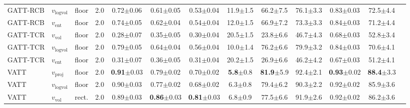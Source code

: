 \begin{table}[t]
{\begin{tabular}{lllcccccccccc}
GATT-RCB & $v_{\mathrm{logvol}}$ & floor & 2.0 & 0.72{\scriptsize$\pm$0.06} & 0.61{\scriptsize$\pm$0.05} & 0.53{\scriptsize$\pm$0.04} & 11.9{\scriptsize$\pm$1.5} & 66.2{\scriptsize$\pm$7.5} & 76.1{\scriptsize$\pm$3.3} & 0.83{\scriptsize$\pm$0.03} & 72.5{\scriptsize$\pm$4.4} \\
GATT-RCB & $v_{\mathrm{ent}}$ & floor & 2.0 & 0.74{\scriptsize$\pm$0.05} & 0.62{\scriptsize$\pm$0.04} & 0.54{\scriptsize$\pm$0.04} & 12.0{\scriptsize$\pm$1.5} & 66.9{\scriptsize$\pm$7.2} & 73.3{\scriptsize$\pm$3.3} & 0.84{\scriptsize$\pm$0.03} & 71.2{\scriptsize$\pm$4.4} \\
\addlinespace[2pt]
GATT-TCR & $v_{\mathrm{vol}}$ & floor & 2.0 & 0.28{\scriptsize$\pm$0.07} & 0.35{\scriptsize$\pm$0.05} & 0.30{\scriptsize$\pm$0.04} & 20.5{\scriptsize$\pm$1.5} & 23.8{\scriptsize$\pm$6.6} & 46.7{\scriptsize$\pm$4.3} & 0.68{\scriptsize$\pm$0.03} & 52.8{\scriptsize$\pm$3.4} \\
GATT-TCR & $v_{\mathrm{logvol}}$ & floor & 2.0 & 0.79{\scriptsize$\pm$0.05} & 0.64{\scriptsize$\pm$0.04} & 0.56{\scriptsize$\pm$0.04} & 10.0{\scriptsize$\pm$1.4} & 76.2{\scriptsize$\pm$6.6} & 79.9{\scriptsize$\pm$3.2} & 0.84{\scriptsize$\pm$0.03} & 70.6{\scriptsize$\pm$4.1} \\
GATT-TCR & $v_{\mathrm{ent}}$ & floor & 2.0 & 0.31{\scriptsize$\pm$0.07} & 0.36{\scriptsize$\pm$0.05} & 0.31{\scriptsize$\pm$0.04} & 20.2{\scriptsize$\pm$1.5} & 26.9{\scriptsize$\pm$6.6} & 46.2{\scriptsize$\pm$4.2} & 0.67{\scriptsize$\pm$0.03} & 51.2{\scriptsize$\pm$4.1} \\
\addlinespace[2pt]
VATT & $v_{\mathrm{proj}}$ & floor & 2.0 & \textbf{0.91}{\scriptsize$\pm$0.03} & 0.79{\scriptsize$\pm$0.02} & 0.70{\scriptsize$\pm$0.02} & \textbf{5.8}{\scriptsize$\pm$0.8} & \textbf{81.9}{\scriptsize$\pm$5.9} & 92.4{\scriptsize$\pm$2.1} & \textbf{0.93}{\scriptsize$\pm$0.02} & \textbf{88.4}{\scriptsize$\pm$3.3} \\
VATT & $v_{\mathrm{logvol}}$ & floor & 2.0 & 0.90{\scriptsize$\pm$0.03} & 0.77{\scriptsize$\pm$0.02} & 0.68{\scriptsize$\pm$0.02} & 6.3{\scriptsize$\pm$0.8} & 79.4{\scriptsize$\pm$6.2} & 90.3{\scriptsize$\pm$2.2} & 0.92{\scriptsize$\pm$0.02} & 85.9{\scriptsize$\pm$3.6} \\
VATT & $v_{\mathrm{vol}}$ & rect. & 2.0 & 0.89{\scriptsize$\pm$0.03} & \textbf{0.86}{\scriptsize$\pm$0.03} & \textbf{0.81}{\scriptsize$\pm$0.03} & 6.8{\scriptsize$\pm$0.9} & 77.5{\scriptsize$\pm$6.6} & 91.9{\scriptsize$\pm$2.6} & 0.92{\scriptsize$\pm$0.02} & 86.2{\scriptsize$\pm$3.6} \\

\end{tabular}}
\end{table}
